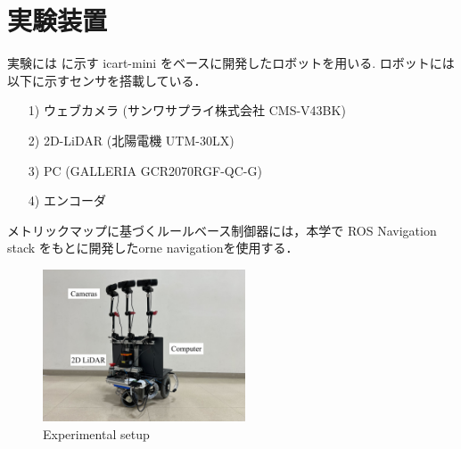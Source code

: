 \section{実験装置}
実験には  に示す icart-mini\cite{icart} をベースに開発したロボットを用いる.
ロボットには以下に示すセンサを搭載している．
\begin{enumerate}
    \item [1)] ウェブカメラ (サンワサプライ株式会社 CMS-V43BK) 
    \item [2)] 2D-LiDAR (北陽電機 UTM-30LX)
    \item [3)] PC (GALLERIA GCR2070RGF-QC-G)
    \item [4)] エンコーダ
\end{enumerate}
メトリックマップに基づくルールベース制御器には，本学で ROS Navigation stack をもとに開発したorne navigation\cite{orne_nav}を使用する．

\begin{figure}[htbp]
    \centering
     \includegraphics[width=60mm]{images/pdf/ishiguro/gamma.pdf}
     \caption{Experimental setup}
     \label{fig:gamma}
\end{figure}